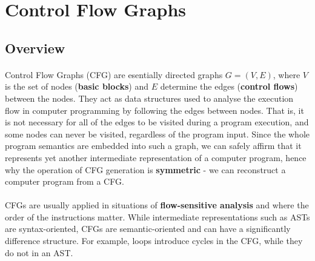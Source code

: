 \section{Control Flow Graphs}
\subsection{Overview}
\paragraph*{}
Control Flow Graphs (CFG) are esentially directed graphs $G=(V, E)$, where $V$ is the set of nodes (\textbf{basic blocks}) and $E$ determine the edges (\textbf{control flows}) between the nodes. They act as data structures used to analyse the execution flow in computer programming by following the edges between nodes. That is, it is not necessary for all of the edges to be visited during a program execution, and some nodes can never be visited, regardless of the program input. Since the whole program semantics are embedded into such a graph, we can safely affirm that it represents yet another intermediate representation of a computer program, hence why the operation of CFG generation is \textbf{symmetric} - we can reconstruct a computer program from a CFG.

\paragraph*{}
CFGs are usually applied in situations of \textbf{flow-sensitive analysis} and where the order of the instructions matter. While intermediate representations such as ASTs are syntax-oriented, CFGs are semantic-oriented and can have a significantly difference structure. For example, loops introduce cycles in the CFG, while they do not in an AST.

